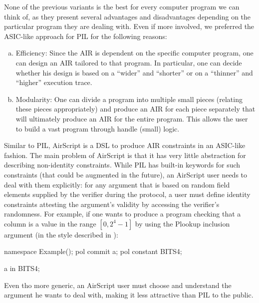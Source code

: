 None of the previous variants is the best for every computer program we can think of, as they present several advantages and disadvantages depending on the particular program they are dealing with. Even if more involved, we preferred the ASIC-like approach for PIL for the following reasons:
\begin{enumerate}[a)]
    \item Efficiency: Since the AIR is dependent on the specific computer program, one can design an AIR tailored to that program. In particular, one can decide whether his design is based on a ``wider'' and ``shorter'' or on a ``thinner'' and ``higher'' execution trace.
    \item Modularity: One can divide a program into multiple small pieces (relating these pieces appropriately) and produce an AIR for each piece separately that will ultimately produce an AIR for the entire program. This allows the user to build a vast program through handle (small) logic. 
\end{enumerate}

Similar to PIL, AirScript is a DSL to produce AIR constraints in an ASIC-like fashion. The main problem of AirScript is that it has very little abstraction for describing non-identity constraints. While PIL has built-in keywords for such constraints (that could be augmented in the future), an AirScript user needs to deal with them explicitly: for any argument that is based on random field elements supplied by the verifier during the protocol, a user must define identity constraints attesting the argument's validity by accessing the verifier's randomness. For example, if one wants to produce a program checking that a column is a value in the range $[0,2^4-1]$ by using the Plookup \cite{EPRINT:GabWil20} inclusion argument (in the style described in \cite{EPRINT:PFMBM22}):
\begin{pil}
namespace Example();
    pol commit a;
    pol constant BITS4;

    a in BITS4;
\end{pil}
Even tho more generic, an AirScript user must choose and understand the argument he wants to deal with, making it less attractive than PIL to the public. 

